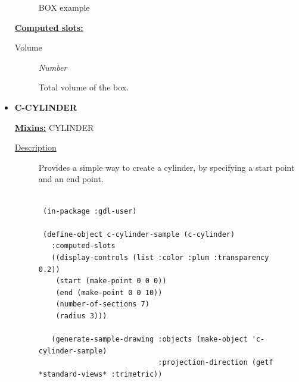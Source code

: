 \documentclass [11pt]{book}
\begin{document}
\begin{itemize}
\begin{figure}
\caption{BOX example}

\label{fig:BOX}

\end{figure}





\textbf{
\underline{Computed slots:}}

\begin{description}

\item [Volume]
\emph{Number}

 Total volume of the box.




\end{description}







\item {}
\label{prim:c-cylinder}
\textbf{C-CYLINDER}


\textbf{
\underline{Mixins:}} CYLINDER





\begin{description}

\item [
\underline{Description}]


Provides a simple way to create a cylinder, by specifying a start point and an end point.



\end{description}




\begin{figure}
\begin{lrbox}{\boxedverb}
\begin{minipage}{\linewidth}
{\small

\begin{verbatim}

 (in-package :gdl-user)

 (define-object c-cylinder-sample (c-cylinder)
   :computed-slots
   ((display-controls (list :color :plum :transparency 0.2))
    (start (make-point 0 0 0))
    (end (make-point 0 0 10))
    (number-of-sections 7)
    (radius 3)))

   (generate-sample-drawing :objects (make-object 'c-cylinder-sample)
                            :projection-direction (getf *standard-views* :trimetric))
   



\end{verbatim}}
\end{minipage}
\end{lrbox}
\end{figure}
\end{itemize}
\end{document}
